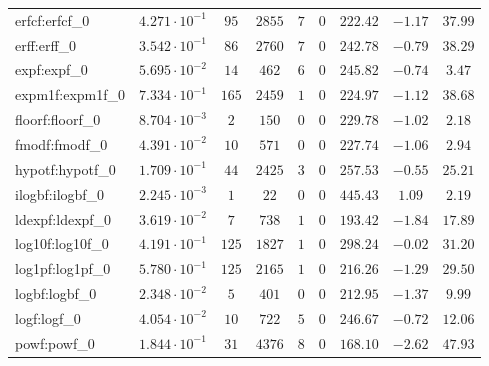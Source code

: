 \begin{tabular}{|l|c|c|c|c|c|c|c|c|}
erfcf:erfcf\_0               & $ 4.271 \cdot 10^{-1} $ & $ 95     $ & $ 2855  $ & $ 7   $ & $ 0   $ & $ 222.42      $ & $ -1.17   $ & $ 37.99   $ \\
erff:erff\_0                 & $ 3.542 \cdot 10^{-1} $ & $ 86     $ & $ 2760  $ & $ 7   $ & $ 0   $ & $ 242.78      $ & $ -0.79   $ & $ 38.29   $ \\
expf:expf\_0                 & $ 5.695 \cdot 10^{-2} $ & $ 14     $ & $ 462   $ & $ 6   $ & $ 0   $ & $ 245.82      $ & $ -0.74   $ & $ 3.47    $ \\
expm1f:expm1f\_0             & $ 7.334 \cdot 10^{-1} $ & $ 165    $ & $ 2459  $ & $ 1   $ & $ 0   $ & $ 224.97      $ & $ -1.12   $ & $ 38.68   $ \\
floorf:floorf\_0             & $ 8.704 \cdot 10^{-3} $ & $ 2      $ & $ 150   $ & $ 0   $ & $ 0   $ & $ 229.78      $ & $ -1.02   $ & $ 2.18    $ \\
fmodf:fmodf\_0               & $ 4.391 \cdot 10^{-2} $ & $ 10     $ & $ 571   $ & $ 0   $ & $ 0   $ & $ 227.74      $ & $ -1.06   $ & $ 2.94    $ \\
hypotf:hypotf\_0             & $ 1.709 \cdot 10^{-1} $ & $ 44     $ & $ 2425  $ & $ 3   $ & $ 0   $ & $ 257.53      $ & $ -0.55   $ & $ 25.21   $ \\
ilogbf:ilogbf\_0             & $ 2.245 \cdot 10^{-3} $ & $ 1      $ & $ 22    $ & $ 0   $ & $ 0   $ & $ 445.43      $ & $ 1.09    $ & $ 2.19    $ \\
ldexpf:ldexpf\_0             & $ 3.619 \cdot 10^{-2} $ & $ 7      $ & $ 738   $ & $ 1   $ & $ 0   $ & $ 193.42      $ & $ -1.84   $ & $ 17.89   $ \\
log10f:log10f\_0             & $ 4.191 \cdot 10^{-1} $ & $ 125    $ & $ 1827  $ & $ 1   $ & $ 0   $ & $ 298.24      $ & $ -0.02   $ & $ 31.20   $ \\
log1pf:log1pf\_0             & $ 5.780 \cdot 10^{-1} $ & $ 125    $ & $ 2165  $ & $ 1   $ & $ 0   $ & $ 216.26      $ & $ -1.29   $ & $ 29.50   $ \\
logbf:logbf\_0               & $ 2.348 \cdot 10^{-2} $ & $ 5      $ & $ 401   $ & $ 0   $ & $ 0   $ & $ 212.95      $ & $ -1.37   $ & $ 9.99    $ \\
logf:logf\_0                 & $ 4.054 \cdot 10^{-2} $ & $ 10     $ & $ 722   $ & $ 5   $ & $ 0   $ & $ 246.67      $ & $ -0.72   $ & $ 12.06   $ \\
powf:powf\_0                 & $ 1.844 \cdot 10^{-1} $ & $ 31     $ & $ 4376  $ & $ 8   $ & $ 0   $ & $ 168.10      $ & $ -2.62   $ & $ 47.93   $ \\

\end{tabular}
